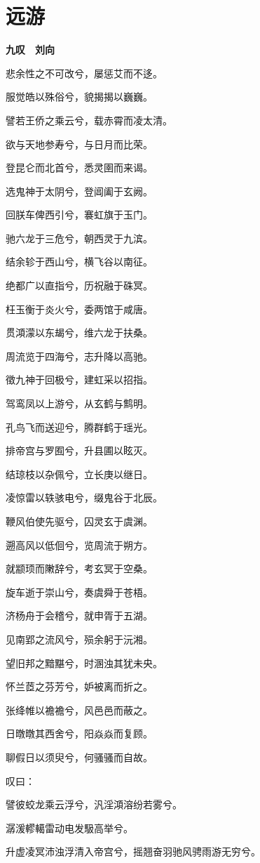 \documentclass[12pt,a4paper]{ctexbook}
\begin{document}
\section{远游}
\textbf{九叹　刘向}\par\vspace{0.5em}
悲余性之不可改兮，屡惩艾而不迻。\par
服觉皓以殊俗兮，貌揭揭以巍巍。\par
譬若王侨之乘云兮，载赤霄而凌太清。\par
欲与天地参寿兮，与日月而比荣。\par
登昆仑而北首兮，悉灵圉而来谒。\par
选鬼神于太阴兮，登阊阖于玄阙。\par
回朕车俾西引兮，褰虹旗于玉门。\par
驰六龙于三危兮，朝西灵于九滨。\par
结余轸于西山兮，横飞谷以南征。\par
绝都广以直指兮，历祝融于硃冥。\par
枉玉衡于炎火兮，委两馆于咸唐。\par
贯澒濛以东朅兮，维六龙于扶桑。\par
周流览于四海兮，志升降以高驰。\par
徵九神于回极兮，建虹采以招指。\par
驾鸾凤以上游兮，从玄鹤与鹪明。\par
孔鸟飞而送迎兮，腾群鹤于瑶光。\par
排帝宫与罗囿兮，升县圃以眩灭。\par
结琼枝以杂佩兮，立长庚以继日。\par
凌惊雷以轶骇电兮，缀鬼谷于北辰。\par
鞭风伯使先驱兮，囚灵玄于虞渊。\par
遡高风以低佪兮，览周流于朔方。\par
就颛顼而敶辞兮，考玄冥于空桑。\par
旋车逝于崇山兮，奏虞舜于苍梧。\par
济杨舟于会稽兮，就申胥于五湖。\par
见南郢之流风兮，殒余躬于沅湘。\par
望旧邦之黯黮兮，时溷浊其犹未央。\par
怀兰茝之芬芳兮，妒被离而折之。\par
张绛帷以襜襜兮，风邑邑而蔽之。\par
日暾暾其西舍兮，阳焱焱而复顾。\par
聊假日以须臾兮，何骚骚而自故。\par
叹曰：\par
譬彼蛟龙乘云浮兮，汎淫澒溶纷若雾兮。\par
潺湲轇轕雷动电发馺高举兮。\par
升虚凌冥沛浊浮清入帝宫兮，摇翘奋羽驰风骋雨游无穷兮。\par
\end{document}
